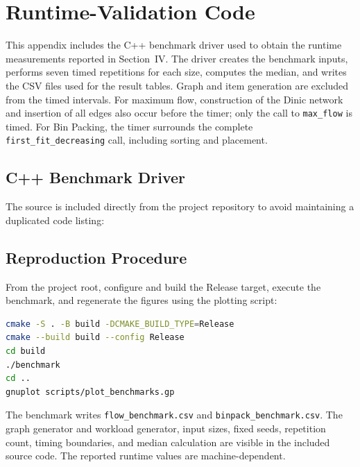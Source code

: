 \section{Runtime-Validation Code}\label{app:benchmark-code}

This appendix includes the C++ benchmark driver used to obtain the runtime measurements reported in Section~IV. The driver creates the benchmark inputs, performs seven timed repetitions for each size, computes the median, and writes the CSV files used for the result tables. Graph and item generation are excluded from the timed intervals. For maximum flow, construction of the Dinic network and insertion of all edges also occur before the timer; only the call to \texttt{max\_flow} is timed. For Bin Packing, the timer surrounds the complete \texttt{first\_fit\_decreasing} call, including sorting and placement.

\subsection{C++ Benchmark Driver}
The source is included directly from the project repository to avoid maintaining a duplicated code listing:


\subsection{Reproduction Procedure}
From the project root, configure and build the Release target, execute the benchmark, and regenerate the figures using the plotting script:
\begin{lstlisting}[language=bash,caption={Reproducing the benchmark data and figures}]
cmake -S . -B build -DCMAKE_BUILD_TYPE=Release
cmake --build build --config Release
cd build
./benchmark
cd ..
gnuplot scripts/plot_benchmarks.gp
\end{lstlisting}

The benchmark writes \texttt{flow\_benchmark.csv} and \texttt{binpack\_benchmark.csv}. The graph generator and workload generator, input sizes, fixed seeds, repetition count, timing boundaries, and median calculation are visible in the included source code. The reported runtime values are machine-dependent.
